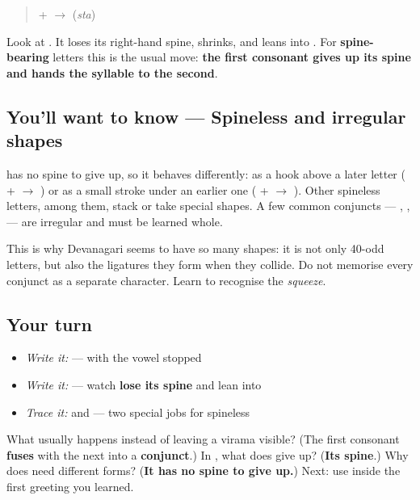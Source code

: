 \begin{quote}
 +  $\to$ \textbf{} (\emph{sta})
\end{quote}

Look at . It loses its right-hand spine, shrinks, and leans into . For \textbf{spine-bearing} letters this is the usual move: \textbf{the first consonant gives up its spine and hands the syllable to the second}.

\subsection*{You'll want to know — Spineless and irregular shapes}
 has no spine to give up, so it behaves differently: as a hook above a later letter ( +  $\to$ \textbf{}) or as a small stroke under an earlier one ( +  $\to$ \textbf{}). Other spineless letters, \textbf{} among them, stack or take special shapes. A few common conjuncts — \textbf{}, \textbf{}, \textbf{} — are irregular and must be learned whole.

This is why Devanagari seems to have so many shapes: it is not only 40-odd letters, but also the ligatures they form when they collide. Do not memorise every conjunct as a separate character. Learn to recognise the \emph{squeeze}.

\subsection*{Your turn}
\begin{itemize}
\raggedright
  \item \emph{Write it:}  —  with the vowel stopped
  \item \emph{Write it:}  — watch  \textbf{lose its spine} and lean into 
  \item \emph{Trace it:}  and  — two special jobs for spineless 
\end{itemize}

\begin{tcolorbox}[breakable,colback=teal!4,colframe=teal!35!black,title={Before you move on}]
What usually happens instead of leaving a virama visible? (The first consonant \textbf{fuses} with the next into a \textbf{conjunct}.) In \textbf{}, what does  give up? (\textbf{Its spine}.) Why does  need different forms? (\textbf{It has no spine to give up.}) Next: use \textbf{} inside the first greeting you learned.
\end{tcolorbox}
